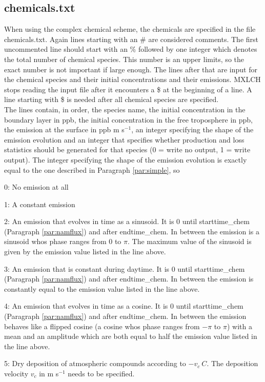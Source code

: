 \documentclass[twoside,11pt,fleqn,a4paper,english,openright]{report}
\begin{document}
\subsection{chemicals.txt}\label{par:mozartchemicals}
When using the complex chemical scheme, the chemicals are specified in the file chemicals.txt. Again lines starting with an \# are considered comments. The first uncommented line should start with an \% followed by one integer which denotes the total number of chemical species. This number is an upper limits, so the exact number is not important if large enough. The lines after that are input for the chemical species and their initial concentrations and their emissions. MXLCH stops reading the input file after it encounters a \$ at the beginning of a line. A line starting with \$ is needed after all chemical species are specified.\\
The lines contain, in order, the species name, the initial concentration in the boundary layer in ppb, the initial concentration in the free troposphere in ppb, the emission at the surface in ppb m s$^{-1}$, an integer specifying the shape of the emission evolution and an integer that specifies whether production and loss statistics should be generated for that species (0 = write no output, 1 = write output). The integer specifying the shape of the emission evolution is exactly equal to the one described in Paragraph \ref{par:simple}, so
\begin{itemize*}
\item[0:] No emission at all
\item[1:] A constant emission
\item[2:] An emission that evolves in time as a sinusoid. It is 0 until starttime\_chem (Paragraph \ref{par:namflux}) and after endtime\_chem. In between the emission is a sinusoid whos phase ranges from 0 to $\pi$. The maximum value of the sinusoid is given by the emission value listed in the line above.
\item[3:] An emission that is constant during daytime. It is 0 until starttime\_chem (Paragraph \ref{par:namflux}) and after endtime\_chem. In between the emission is constantly equal to the emission value listed in the line above.
\item[4:] An emission that evolves in time as a cosine. It is 0 until starttime\_chem (Paragraph \ref{par:namflux}) and after endtime\_chem. In between the emission behaves like a flipped cosine (a cosine whos phase ranges from $-\pi$ to $\pi$) with a mean and an amplitude which are both equal to half the emission value listed in the line above.
\item[5:] Dry deposition of atmospheric compounds according to $-v_c~C$. The deposition velocity $v_c$ in m s$^{-1}$ needs to be specified.
\end{itemize*}
\end{document}
